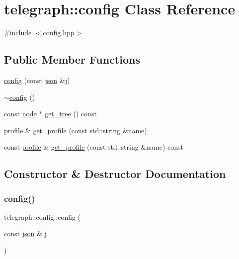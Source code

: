\hypertarget{classtelegraph_1_1config}{}\section{telegraph\+:\+:config Class Reference}
\label{classtelegraph_1_1config}


{\ttfamily \#include $<$config.\+hpp$>$}

\subsection*{Public Member Functions}
\begin{DoxyCompactItemize}
\item 
\hyperlink{classtelegraph_1_1config_a5f3f45e1e31d82f52c0242f7cb14083c}{config} (const \hyperlink{namespacetelegraph_ab87b47a6b955c365ddd74c343ecc16f4}{json} \&j)
\item 
\hyperlink{classtelegraph_1_1config_a58461425cd48e9ce43eeaf5cffdf68ba}{$\sim$config} ()
\item 
const \hyperlink{classtelegraph_1_1node}{node} $\ast$ \hyperlink{classtelegraph_1_1config_a037e49fa107a7d738747caa7212388ad}{get\+\_\+tree} () const
\item 
\hyperlink{classtelegraph_1_1profile}{profile} \& \hyperlink{classtelegraph_1_1config_a9002a994691d15a3252c3fd23eaca014}{get\+\_\+profile} (const std\+::string \&name)
\item 
const \hyperlink{classtelegraph_1_1profile}{profile} \& \hyperlink{classtelegraph_1_1config_a7a8ab41521fa4af8d17d009c3872fb87}{get\+\_\+profile} (const std\+::string \&name) const
\end{DoxyCompactItemize}


\subsection{Constructor \& Destructor Documentation}
\mbox{\label{classtelegraph_1_1config_a5f3f45e1e31d82f52c0242f7cb14083c}} 
\subsubsection{\texorpdfstring{config()}{config()}}
{\footnotesize\ttfamily telegraph\+::config\+::config (\begin{DoxyParamCaption}\item[{const \hyperlink{namespacetelegraph_ab87b47a6b955c365ddd74c343ecc16f4}{json} \&}]{j }\end{DoxyParamCaption})}

